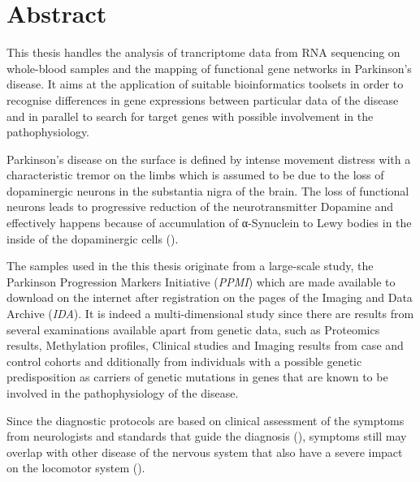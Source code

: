 \documentclass[12pt]{article}
\begin{document}
        \section*{Abstract}
            \begin{spacing}{1.5}
                \par
                    This thesis handles the analysis of trancriptome data from RNA sequencing on whole-blood samples and the mapping of functional gene networks in Parkinson's disease. It aims at the application of suitable bioinformatics toolsets in order to recognise differences in gene expressions between particular data of the disease and in parallel to search for target genes with possible involvement in the pathophysiology.
                \par
                    Parkinson's disease on the surface is defined by intense movement distress with a characteristic tremor on the limbs which is assumed to be due to the loss of dopaminergic neurons in the substantia nigra of the brain. The loss of functional neurons leads to progressive reduction of the neurotransmitter Dopamine and effectively happens because of accumulation of α-Synuclein to Lewy bodies in the inside of the dopaminergic cells (\emph{\cite{Balestrino2020ParkinsonDisease}}).
                \par
                    The samples used in the this thesis originate from a large-scale study, the Parkinson Progression Markers Initiative (\emph{PPMI}) which are made available to download on the internet after registration on the pages of the Imaging and Data Archive (\emph{IDA}). It is indeed a multi-dimensional study since there are results from several examinations available apart from genetic data, such as Proteomics results, Methylation profiles, Clinical studies and Imaging results from case and control cohorts and dditionally from individuals with a possible genetic predisposition as carriers of genetic mutations in genes that are known to be involved in the pathophysiology of the disease.
                \par
                    Since the diagnostic protocols are based on clinical assessment of the symptoms from neurologists and standards that guide the diagnosis (\emph{\cite{Koller2018TableGuidelines}}), symptoms still may overlap with other disease of the nervous system that also have a severe impact on the locomotor system (\emph{\cite{Tolosa2021ChallengesDisease}}).
                \par

\end{spacing}
\end{document}
